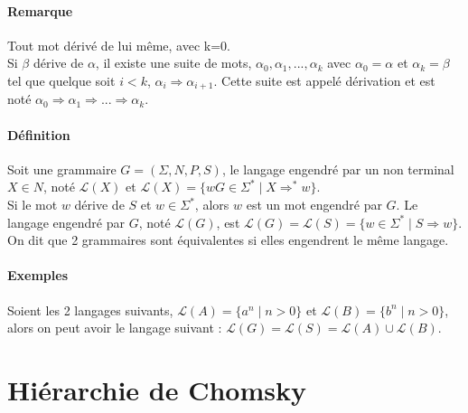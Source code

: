 

\paragraph{Remarque} %
\label{par:remarque}

Tout mot dérivé de lui même, avec k=0.\\
Si $\beta$ dérive de $\alpha$, il existe une suite de mots, $\alpha_0, \alpha_1, ... , \alpha_k$ avec $\alpha_0 = \alpha$ et $\alpha_k = \beta$ tel que quelque soit $i < k$, $\alpha_i \Rightarrow \alpha_{i+1}$. Cette suite est appelé dérivation et est noté $\alpha_0 \Rightarrow \alpha_1 \Rightarrow ... \Rightarrow \alpha_k$.



\paragraph{Définition} %
\label{par:d_finition}

Soit une grammaire $G=(\Sigma,N,P,S)$, le langage engendré par un non terminal $X \in N$, noté $\mathcal{L}(X)$ et $\mathcal{L}(X)=\{wG \in \Sigma^* \mid X \Rightarrow^* w \}$.\\
Si le mot $w$ dérive de $S$ et $w \in \Sigma^*$, alors $w$ est un mot engendré par $G$. Le langage engendré par $G$, noté $\mathcal{L}(G)$, est $\mathcal{L}(G)=\mathcal{L}(S)=\{w \in \Sigma^* \mid S \Rightarrow w\}.$\\
On dit que 2 grammaires sont équivalentes si elles engendrent le même langage.



\paragraph{Exemples} %
\label{par:exemples}

Soient les 2 langages suivants, $\mathcal{L}(A)=\{a^n \mid n > 0\}$ et $\mathcal{L}(B)=\{b^n \mid n > 0\}$, alors on peut avoir le langage suivant : $\mathcal{L}(G) = \mathcal{L}(S) = \mathcal{L}(A) \cup \mathcal{L}(B)$.





\section{Hiérarchie de Chomsky} %
\label{sec:hi_rarchie_de_chomsky}


